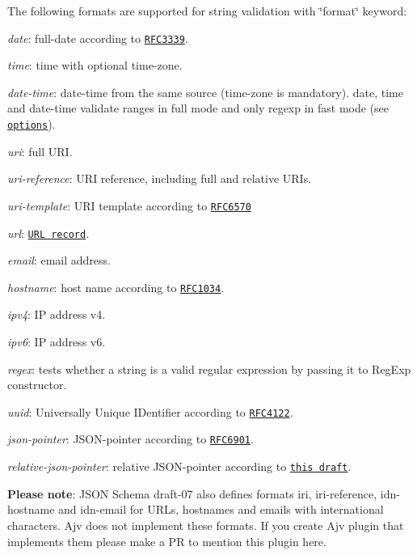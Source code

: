 The following formats are supported for string validation with \char`\"{}format\char`\"{} keyword\+:


\begin{DoxyItemize}
\item {\itshape date}\+: full-\/date according to \href{http://tools.ietf.org/html/rfc3339#section-5.6}{\tt R\+F\+C3339}.
\item {\itshape time}\+: time with optional time-\/zone.
\item {\itshape date-\/time}\+: date-\/time from the same source (time-\/zone is mandatory). {\ttfamily date}, {\ttfamily time} and {\ttfamily date-\/time} validate ranges in {\ttfamily full} mode and only regexp in {\ttfamily fast} mode (see \href{#options}{\tt options}).
\item {\itshape uri}\+: full U\+RI.
\item {\itshape uri-\/reference}\+: U\+RI reference, including full and relative U\+R\+Is.
\item {\itshape uri-\/template}\+: U\+RI template according to \href{https://tools.ietf.org/html/rfc6570}{\tt R\+F\+C6570}
\item {\itshape url}\+: \href{https://url.spec.whatwg.org/#concept-url}{\tt U\+RL record}.
\item {\itshape email}\+: email address.
\item {\itshape hostname}\+: host name according to \href{http://tools.ietf.org/html/rfc1034#section-3.5}{\tt R\+F\+C1034}.
\item {\itshape ipv4}\+: IP address v4.
\item {\itshape ipv6}\+: IP address v6.
\item {\itshape regex}\+: tests whether a string is a valid regular expression by passing it to Reg\+Exp constructor.
\item {\itshape uuid}\+: Universally Unique I\+Dentifier according to \href{http://tools.ietf.org/html/rfc4122}{\tt R\+F\+C4122}.
\item {\itshape json-\/pointer}\+: J\+S\+O\+N-\/pointer according to \href{https://tools.ietf.org/html/rfc6901}{\tt R\+F\+C6901}.
\item {\itshape relative-\/json-\/pointer}\+: relative J\+S\+O\+N-\/pointer according to \href{http://tools.ietf.org/html/draft-luff-relative-json-pointer-00}{\tt this draft}.
\end{DoxyItemize}

{\bfseries Please note}\+: J\+S\+ON Schema draft-\/07 also defines formats {\ttfamily iri}, {\ttfamily iri-\/reference}, {\ttfamily idn-\/hostname} and {\ttfamily idn-\/email} for U\+R\+Ls, hostnames and emails with international characters. Ajv does not implement these formats. If you create Ajv plugin that implements them please make a PR to mention this plugin here.

